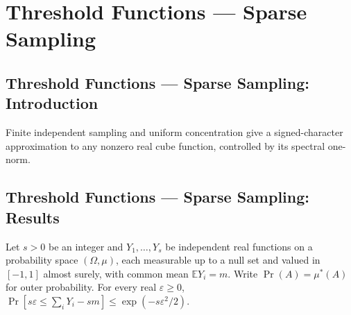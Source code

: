 \section{Threshold Functions --- Sparse Sampling}
\subsection*{Threshold Functions --- Sparse Sampling: Introduction}
Finite independent sampling and uniform concentration give a signed-character approximation to any nonzero real cube function, controlled by its spectral one-norm.

\subsection*{Threshold Functions --- Sparse Sampling: Results}

\begin{theorem}
\leanok
{}
Let $s>0$ be an integer and $Y_1,\ldots,Y_s$ be independent real functions on a probability space $(\Omega,\mu)$, each measurable up to a null set and valued in $[-1,1]$ almost surely, with common mean $\mathbb E Y_i=m$. Write $\Pr(A)=\mu^*(A)$ for outer probability. For every real $\varepsilon\ge0$, $\Pr[s\varepsilon\le\sum_iY_i-sm]\le\exp(-s\varepsilon^2/2)$.
\end{theorem}

